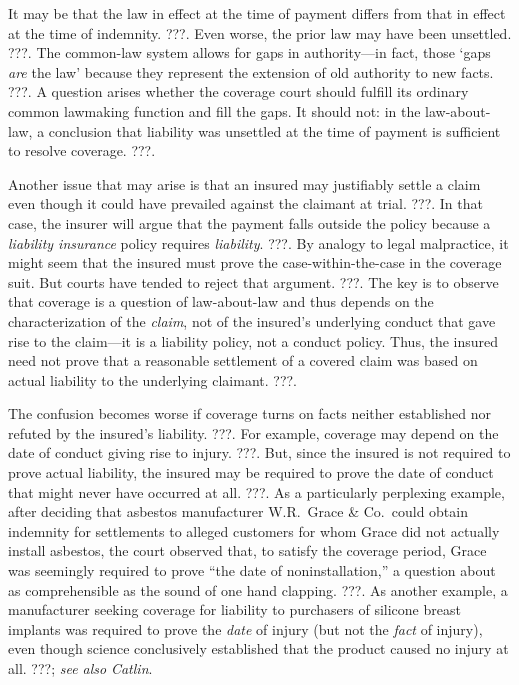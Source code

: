 \documentclass[
  12pt,
  letterpaper,
]{scrartcl}
\begin{document}
It may be that the law in effect at the time of payment differs from that in
effect at the time of indemnity. ???. Even worse, the prior law may have been
unsettled. ???. The common-law system allows for gaps in authority---in fact,
those `gaps \emph{are} the law' because they represent the extension of old
authority to new facts. ???. A question arises whether the coverage court
should fulfill its ordinary common lawmaking function and fill the gaps. It
should not: in the law-about-law, a conclusion that liability was unsettled at
the time of payment is sufficient to resolve coverage. ???.

Another issue that may arise is that an insured may justifiably settle a claim
even though it could have prevailed against the claimant at trial. ???. In that
case, the insurer will argue that the payment falls outside the policy
because a \emph{liability insurance} policy requires \emph{liability}. ???. By
analogy to legal malpractice, it might seem that the insured must prove the
case-within-the-case in the coverage suit. But courts have tended to reject
that argument. ???. The key is to observe that coverage is a question of
law-about-law and thus depends on the characterization of the \emph{claim}, not
of the insured's underlying conduct that gave rise to the claim---it is
a liability policy, not a conduct policy. Thus, the insured need not
prove that a reasonable settlement of a covered claim was based on actual
liability to the underlying claimant. ???.

The confusion becomes worse if coverage turns on facts neither established nor
refuted by the insured's liability. ???. For
example, coverage may depend on the date of conduct giving rise to injury. ???.
But, since the insured is not required to prove actual liability, the insured
may be required to prove the date of conduct that might never have occurred at
all. ???. As a particularly perplexing example, after deciding that asbestos
manufacturer W.R.~Grace \& Co.~could obtain indemnity for settlements to
alleged customers for whom Grace did not actually install asbestos, the court
observed that, to satisfy the coverage period, Grace
was seemingly required to prove ``the date of noninstallation,'' a question
about as comprehensible as the sound of one hand clapping. ???. As another
example, a manufacturer seeking coverage for liability to purchasers of
silicone breast implants was required to prove the \emph{date} of injury (but
not the \emph{fact} of injury), even though science conclusively established
that the product caused no injury at all. ???; \textit{see also}
\textit{Catlin}.
\end{document}
